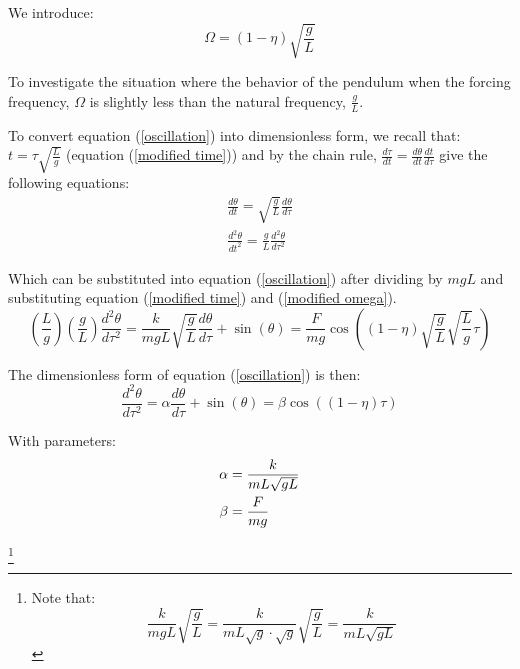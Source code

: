 \documentclass[12pt]{article}
\begin{document}
We introduce:
\begin{equation}
    \Omega = (1 - \eta)\sqrt{\frac{g}{L}}
    \label{modified omega}
\end{equation}

To investigate the situation where the behavior of the pendulum when the forcing frequency, $\Omega$ is slightly less than the natural frequency, $\frac{g}{L}$.

To convert equation (\ref{oscillation}) into dimensionless form, we recall that: $t = \tau\sqrt{\frac{L}{g}}$ (equation (\ref{modified time})) and by the chain rule, $\frac{d\tau}{dt} = \frac{d\theta}{dt}\frac{dt}{d\tau}$ give the following equations:
\begin{equation}
    \begin{split}
        \frac{d\theta}{dt} = \sqrt{\frac{g}{L}}\frac{d\theta}{d\tau} \\
        \frac{d^2\theta}{dt^2} = \frac{g}{L}\frac{d^2\theta}{d\tau^2}
    \end{split}
    \label{chain rules}
\end{equation}

Which can be substituted into equation (\ref{oscillation}) after dividing by $mgL$ and substituting equation (\ref*{modified time}) and (\ref{modified omega}).
\begin{equation}
    (\frac{L}{g})(\frac{g}{L})\frac{d^2\theta}{d\tau^2} = \frac{k}{mgL}\sqrt{\frac{g}{L}}\frac{d\theta}{d\tau} + \sin(\theta) = \frac{F}{mg}\cos((1 - \eta)\sqrt{\frac{g}{L}}\sqrt{\frac{L}{g}}\tau)
\end{equation}

The dimensionless form of equation (\ref{oscillation}) is then:
\begin{equation}
    \frac{d^2\theta}{d\tau^2} = \alpha\frac{d\theta}{d\tau} + \sin(\theta) = \beta\cos((1 - \eta)\tau)
    \label{dimensionless}
\end{equation}

With parameters: 
\begin{equation}
    \centering
    \begin{split}
        \alpha &= \frac{k}{mL\sqrt{gL}}\\
        \beta &= \frac{F}{mg}
    \end{split}
    \label{parameters}
\end{equation}

\footnote{
    Note that:
    \\
        \begin{equation}
            \frac{k}{mgL}\sqrt{\frac{g}{L}} = \frac{k}{mL\sqrt{g}\cdot\sqrt{g}}\sqrt{\frac{g}{L}} = \frac{k}{mL\sqrt{gL}}
        \end{equation}
}
\end{document}
